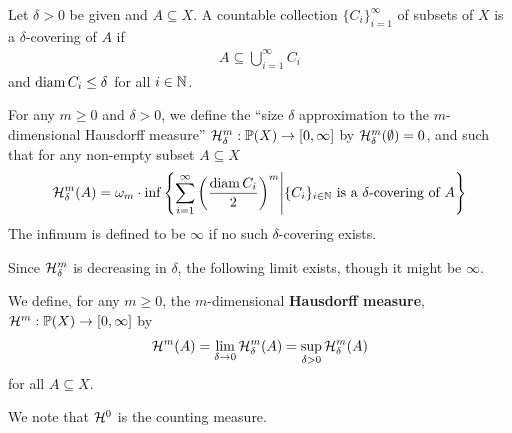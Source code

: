 \begin{definition}
Let $\delta>0$ be given and $A \subseteq X$. A countable collection $\{C_{i}\}_{i=1}^{\infty}$ of subsets of $X$ is a $\delta$-covering of $A$ if
\begin{align*}
	A \subseteq \bigcup_{i=1}^{\infty} C_{i}
\end{align*}
and $\operatorname{diam} C_{i}\le \delta$ for all $i \in \mathbb{N}$.
\end{definition}

\begin{definition}
For any $m \ge 0$ and $\delta > 0$, we define the ``size $\delta$ approximation to the $m$-dimensional Hausdorff measure'' $\mathcal{H}^{m}_{\delta}:\mathbb{P}(X) \to [0, \infty]$ by $\mathcal{H}_{\delta}^{m}(\emptyset)=0$, and such that for any non-empty subset $A \subseteq X$
\begin{align}
	\mathcal{H}_{\delta}^{m}(A) = \omega_{m} \cdot \inf \left\{ \sum_{i=1}^{\infty} \left( \frac{ \operatorname{diam} C_{i} }{2} \right)^{m} \middle| \{C_{i}\}_{i \in \mathbb{N}} \text{ is a } \delta \text{-covering of } A\right\} \label{eq: approx Hausdorff measure}
\end{align}
The infimum is defined to be $\infty$ if no such $\delta$-covering exists.
\end{definition}

Since $\mathcal{H}_{\delta}^{m}$ is decreasing in $\delta$, the following limit exists, though it might be $\infty$.

\begin{definition}
We define, for any $m \ge 0$, the $m$-dimensional \textbf{Hausdorff measure}, $\mathcal{H}^{m}:\mathbb{P}(X) \to [0, \infty]$ by
\begin{align}
	\mathcal{H}^{m}(A) = \lim_{\delta \to 0} \mathcal{H}_{\delta}^{m}(A)=\sup_{\delta > 0}\mathcal{H}^m_{\delta}(A) \label{eq: Hausdorff measure}
\end{align}
for all $A \subseteq X$.
\end{definition}

We note that $\mathcal{H}^0$ is the counting measure.


